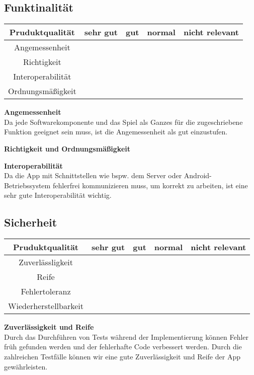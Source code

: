 \documentclass[parskip=full]{scrartcl}
\begin{document}
\subsection{Funktinalität}
\begin{tabular}{| c | c | c | c | c |}
    \hline
    \textbf{Pruduktqualität} & \textbf{sehr gut} & \textbf{gut} & \textbf{normal} & \textbf{nicht relevant} \\ \hline
    Angemessenheit &  &  &  & \\ \hline
    Richtigkeit &  &  &  & \\ \hline
    Interoperabilität &  &  &  &  \\ \hline
    Ordnungsmäßigkeit &  &  &  &  \\ \hline
\end{tabular}

\textbf{Angemessenheit}\\
Da jede Softwarekomponente und das Spiel als Ganzes für die zugeschriebene Funktion geeignet sein muss, ist die Angemessenheit als gut einzustufen.

\textbf{Richtigkeit und Ordnungsmäßigkeit}

\textbf{Interoperabilität}\\
Da die App mit Schnittstellen wie bspw. dem Server oder Android-Betriebssystem fehlerfrei kommunizieren muss, um korrekt zu arbeiten, ist eine sehr gute Interoperabilität wichtig.

\subsection{Sicherheit}
\begin{tabular}{| c | c | c | c | c |}
    \hline
    \textbf{Pruduktqualität} & \textbf{sehr gut} & \textbf{gut} & \textbf{normal} & \textbf{nicht relevant} \\ \hline
    Zuverlässligkeit &  &  &  & \\ \hline
    Reife &  &  &  & \\ \hline
    Fehlertoleranz &  &  &  &  \\ \hline
    Wiederherstellbarkeit &  &  &  &  \\ \hline
\end{tabular}

\textbf{Zuverlässigkeit und Reife}\\
Durch das Durchführen von Tests während der Implementierung können Fehler früh gefunden werden und der fehlerhafte Code verbessert werden.
Durch die zahlreichen Testfälle können wir eine gute Zuverlässigkeit und Reife der App gewährleisten.
\end{document}
